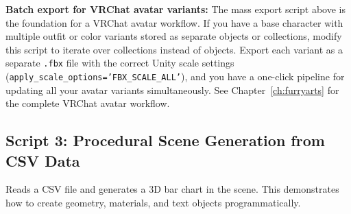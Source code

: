 \begin{furrybox}
\textbf{Batch export for VRChat avatar variants:} The mass export script above is the foundation for a VRChat avatar workflow. If you have a base character with multiple outfit or color variants stored as separate objects or collections, modify this script to iterate over collections instead of objects. Export each variant as a separate \texttt{.fbx} file with the correct Unity scale settings (\texttt{apply\_scale\_options='FBX\_SCALE\_ALL'}), and you have a one-click pipeline for updating all your avatar variants simultaneously. See Chapter~\ref{ch:furryarts} for the complete VRChat avatar workflow.
\end{furrybox}

\subsection{Script 3: Procedural Scene Generation from CSV Data}

Reads a CSV file and generates a 3D bar chart in the scene. This demonstrates how to create geometry, materials, and text objects programmatically.

